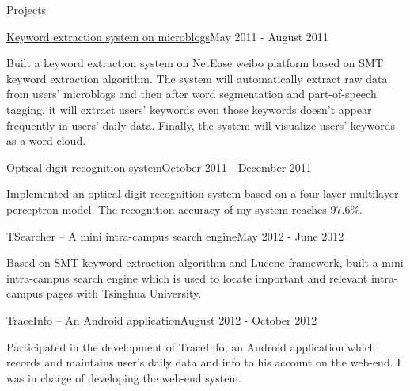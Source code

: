 \documentclass{resume} %
\begin{document}
\begin{rSection}{Projects}
\begin{rSubsection}{\href{http://166.111.138.15:8080/netweibo/index.jsp}{Keyword extraction system on microblogs}}{May 2011 - August 2011}{}{}
\item{} Built a keyword extraction system on NetEase weibo platform based on SMT keyword extraction algorithm. The system will automatically extract raw data from users' microblogs and then after word segmentation and part-of-speech tagging, it will extract users' keywords even those keywords doesn't appear frequently in users' daily data. Finally, the system will visualize users' keywords as a word-cloud.
\end{rSubsection}

\begin{rSubsection}{Optical digit recognition system}{October 2011 - December 2011}{}{}
\item{} Implemented an optical digit recognition system based on a four-layer multilayer perceptron model. The recognition accuracy of my system reaches $97.6\%$.
\end{rSubsection}

\begin{rSubsection}{TSearcher -- A mini intra-campus search engine}{May 2012 - June 2012}{}{}
\item{} Based on SMT keyword extraction algorithm and Lucene framework, built a mini intra-campus search engine which is used to locate important and relevant intra-campus pages with Tsinghua University.
\end{rSubsection}

\begin{rSubsection}{TraceInfo -- An Android application}{August 2012 - October 2012}{}{}
\item{} Participated in the development of TraceInfo, an Android application which records and maintains user's daily data and info to his account on the web-end. I was in charge of developing the web-end system.
\end{rSubsection}
\end{rSection}
\end{document}
